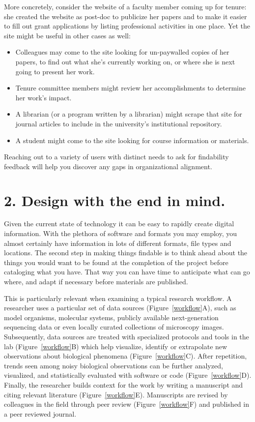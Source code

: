 \documentclass[10pt,letterpaper]{article}
\newcommand{\rulemajor}[1]{\section*{#1}}
\begin{document}
More concretely, consider the website of a faculty member coming up for tenure:
she created the website as post-doc to publicize her papers and to make it
easier to fill out grant applications by listing professional activities in one
place. Yet the site might be useful in other cases as well:

\begin{itemize}

\item
  Colleagues may come to the site looking for un-paywalled copies of her papers,
  to find out what she's currently working on, or where she is next going to
  present her work.

\item
  Tenure committee members might review her accomplishments to determine her
  work's impact.

\item
  A librarian (or a program written by a librarian) might scrape that site for
  journal articles to include in the university's institutional repository.

\item
  A student might come to the site looking for course information or materials.

\end{itemize}

Reaching out to a variety of users with distinct needs to ask for findability
feedback will help you discover any gaps in organizational alignment.

\rulemajor{2. Design with the end in mind.}

Given the current state of technology it can be easy to rapidly create digital
information. With the plethora of software and formats you may employ, you
almost certainly have information in lots of different formats, file types and
locations. The second step in making things findable is to think ahead about
the things you would want to be found at the completion of the project before
cataloging what you have. That way you can have time to anticipate what can go
where, and adapt if necessary before materials are published.

This is particularly relevant when examining a typical research workflow. A
researcher uses a particular set of data sources (Figure~\ref{workflow}A), such
as model organisms, molecular systems, publicly available next-generation
sequencing data or even locally curated collections of microscopy images.
Subsequently, data sources are treated with specialized protocols and tools in
the lab (Figure~\ref{workflow}B) which help visualize, identify or extrapolate
new observations about biological phenomena (Figure~\ref{workflow}C). After
repetition, trends seen among noisy biological observations can be further
analyzed, visualized, and statistically evaluated with software or code
(Figure~\ref{workflow}D). Finally, the researcher builds context for the work by
writing a manuscript and citing relevant literature (Figure~\ref{workflow}E).
Manuscripts are revised by colleagues in the field through peer review
(Figure~\ref{workflow}F) and published in a peer reviewed journal.
\end{document}
